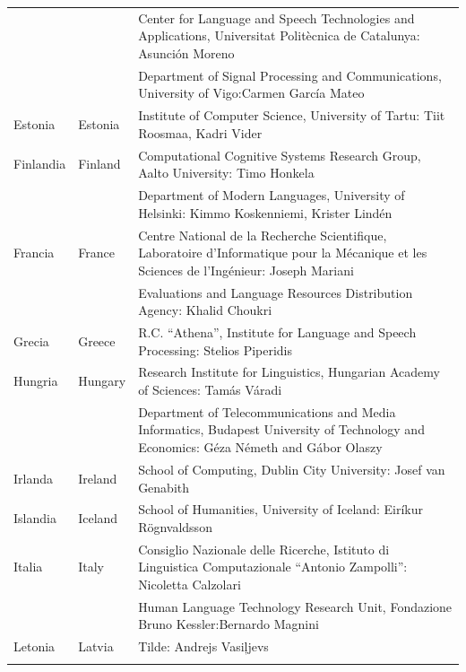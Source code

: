 \begin{longtable}{@{}llp{113mm}@{}}
  & & Center for Language and Speech Technologies and Applications, Universitat Politècnica de Catalunya:  Asunción Moreno \\ \addlinespace 
  & & Department of Signal Processing and Communications, University of Vigo:\newline Carmen García Mateo \\ \addlinespace 
  Estonia   & \textcolor{grey1}{Estonia} & Institute of Computer Science, University of Tartu: Tiit Roosmaa, Kadri Vider\\ \addlinespace
  Finlandia   & \textcolor{grey1}{Finland} & Computational Cognitive Systems Research Group, Aalto University: Timo Honkela\\ \addlinespace
  & & Department of Modern Languages, University of Helsinki: Kimmo Koskenniemi, Krister Lindén \\ \addlinespace
  Francia   & \textcolor{grey1}{France} & Centre National de la Recherche Scientifique, Laboratoire d'Informatique pour la Mécanique et les Sciences de l'Ingénieur: Joseph Mariani \\ \addlinespace
  & & Evaluations and Language Resources Distribution Agency: Khalid Choukri\\ \addlinespace 
  Grecia  & \textcolor{grey1}{Greece} & R.C. “Athena”, Institute for Language and Speech Processing: Stelios Piperidis\\ \addlinespace
  Hungria   & \textcolor{grey1}{Hungary} & Research Institute for Linguistics, Hungarian Academy of Sciences: Tamás Váradi\\  \addlinespace
  & & Department of Telecommunications and Media Informatics, Budapest University of Technology and Economics: Géza Németh and Gábor Olaszy\\ \addlinespace
  Irlanda   & \textcolor{grey1}{Ireland} & School of Computing, Dublin City University: Josef van Genabith\\ \addlinespace
  Islandia   & \textcolor{grey1}{Iceland} & School of Humanities, University of Iceland: Eiríkur Rögnvaldsson\\ \addlinespace
  Italia   & \textcolor{grey1}{Italy} & Consiglio Nazionale delle Ricerche, Istituto di Linguistica Computazionale “Antonio Zampolli”: Nicoletta Calzolari\\ \addlinespace
  & & Human Language Technology Research Unit, Fondazione Bruno Kessler:\newline Bernardo Magnini\\ \addlinespace 
  Letonia   & \textcolor{grey1}{Latvia} & Tilde: Andrejs Vasiļjevs\\ \addlinespace 

\end{longtable}
